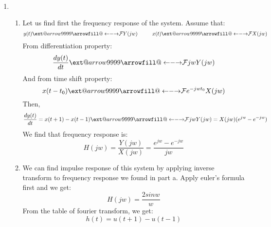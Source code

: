 \documentclass[10pt,a4paper, margin=1in]{article}
\makeatletter
\newcommand\xleftrightarrow[2][]{%
  \ext@arrow 9999{\longleftrightarrowfill@}{#1}{#2}}
\newcommand\longleftrightarrowfill@{%
  \arrowfill@\leftarrow\relbar\rightarrow}
\makeatother
\begin{document}
\begin{enumerate}
\item %
    \begin{enumerate}
    \item Let us find first the frequency response of the system. Assume that: 
    \[y(t) \xleftrightarrow{\mathcal{F}} Y(jw) \hspace{10mm} x(t) \xleftrightarrow{\mathcal{F}} X(jw)\]
    From differentiation property:
    \[\frac{dy(t)}{dt} \xleftrightarrow{\mathcal{F}} jwY(jw)\]
    And from time shift property:
    \[x(t-t_0) \xleftrightarrow{\mathcal{F}} e^{-jwt_0}X(jw)\]
    Then, 
    \[\frac{dy(t)}{dt} = x(t+1) - x(t-1) \xleftrightarrow{\mathcal{F}} jwY(jw) = X(jw)(e^{jw} - e^{-jw})\]
    We find that frequency response is:
    \[H(jw) = \frac{Y(jw)}{X(jw)} = \frac{e^{jw} - e^{-jw}}{jw}\]
    
    \item We can find impulse response of this system by applying inverse transform to frequency response we found in part a. Apply euler's formula first and we get:
    \[H(jw) = \frac{2sinw}{w}\]
    From the table of fourier transform, we get:
    \[h(t) = u(t+1) - u(t-1)\]
    \end{enumerate}


\end{enumerate}
\end{document}
